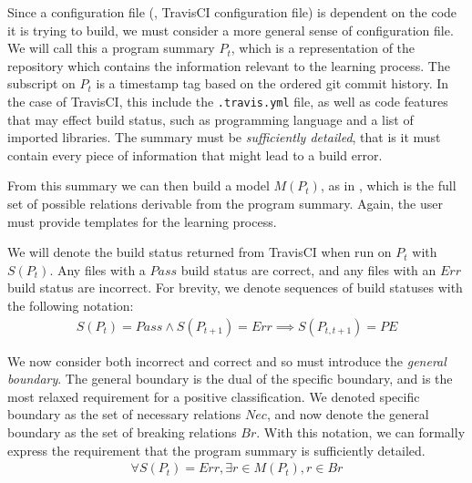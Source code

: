 Since a configuration file (\eg, TravisCI configuration file) is dependent
on the code it is trying to build, 
we must consider a more general sense of configuration file.
We will call this a program summary $P_t$, which is a representation 
of the repository which contains the information 
relevant to the learning process.
The subscript on $P_t$ is a timestamp tag based on 
the ordered git commit history.
In the case of TravisCI, this include the \verb|.travis.yml| file, 
as well as code features that may effect build status, 
such as programming language and a list of imported libraries.
The summary must be \textit{sufficiently detailed}, that is it must contain every piece of information that might lead to a build error.


From this summary we can then build a model $M(P_t)$, as in \app, 
which is the full set of possible relations derivable 
from the program summary.
Again, the user must provide templates for the learning process.

We will denote the build status returned from TravisCI when run on $P_t$ with $S(P_t)$.
Any files with a $Pass$ build status are correct, and any files with an $Err$ build status are incorrect.
For brevity, we denote sequences of build statuses with the following notation:
\begin{align*}
  S(P_t)=Pass \land S(P_{t+1})=Err \implies S(P_{t,t+1}) = PE
\end{align*}

We now consider both incorrect and correct 
and so must introduce the \textit{general boundary}.
The general boundary is the dual of the specific boundary, and is the most relaxed requirement for a positive classification.
We denoted specific boundary as the set of necessary relations $Nec$, and now denote the general boundary as the set of breaking relations $Br$.
With this notation, we can formally express the requirement that the program summary is sufficiently detailed.
\begin{align}
  \forall S(P_t)=Err, \exists r \in M(P_t), r \in Br \label{eq:E1}
\end{align}


